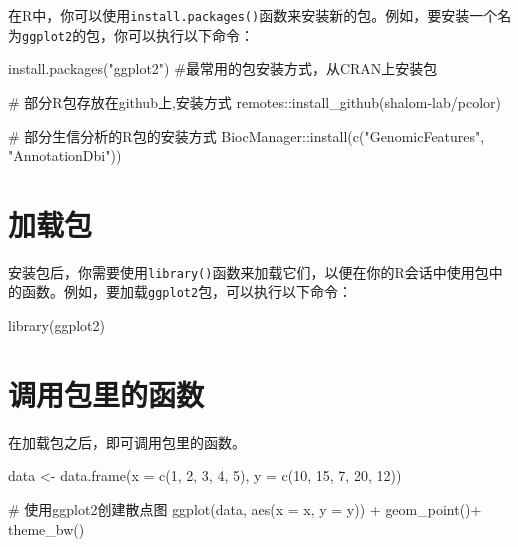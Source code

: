 \documentclass[
  letterpaper,
  DIV=11,
  numbers=noendperiod]{scrreprt}
\newenvironment{Shaded}{\begin{snugshade}}{\end{snugshade}}
\newcommand{\AttributeTok}[1]{\textcolor[rgb]{0.40,0.45,0.13}{#1}}
\newcommand{\CommentTok}[1]{\textcolor[rgb]{0.37,0.37,0.37}{#1}}
\newcommand{\DecValTok}[1]{\textcolor[rgb]{0.68,0.00,0.00}{#1}}
\newcommand{\FunctionTok}[1]{\textcolor[rgb]{0.28,0.35,0.67}{#1}}
\newcommand{\NormalTok}[1]{\textcolor[rgb]{0.00,0.23,0.31}{#1}}
\newcommand{\OtherTok}[1]{\textcolor[rgb]{0.00,0.23,0.31}{#1}}
\newcommand{\SpecialCharTok}[1]{\textcolor[rgb]{0.37,0.37,0.37}{#1}}
\newcommand{\StringTok}[1]{\textcolor[rgb]{0.13,0.47,0.30}{#1}}
\begin{document}
在R中，你可以使用\texttt{install.packages()}函数来安装新的包。例如，要安装一个名为\texttt{ggplot2}的包，你可以执行以下命令：

\begin{Shaded}
\begin{Highlighting}[]
\FunctionTok{install.packages}\NormalTok{(}\StringTok{"ggplot2"}\NormalTok{) }\CommentTok{\#最常用的包安装方式，从CRAN上安装包}

\CommentTok{\# 部分R包存放在github上,安装方式}
\NormalTok{remotes}\SpecialCharTok{::}\FunctionTok{install\_github}\NormalTok{(}\StringTok{\textquotesingle{}shalom{-}lab/pcolor\textquotesingle{}}\NormalTok{)}

\CommentTok{\# 部分生信分析的R包的安装方式}
\NormalTok{BiocManager}\SpecialCharTok{::}\FunctionTok{install}\NormalTok{(}\FunctionTok{c}\NormalTok{(}\StringTok{"GenomicFeatures"}\NormalTok{, }\StringTok{"AnnotationDbi"}\NormalTok{))}
\end{Highlighting}
\end{Shaded}

\section{加载包}\label{ux52a0ux8f7dux5305}

安装包后，你需要使用\texttt{library()}函数来加载它们，以便在你的R会话中使用包中的函数。例如，要加载\texttt{ggplot2}包，可以执行以下命令：

\begin{Shaded}
\begin{Highlighting}[]
\FunctionTok{library}\NormalTok{(ggplot2)}
\end{Highlighting}
\end{Shaded}

\section{调用包里的函数}\label{ux8c03ux7528ux5305ux91ccux7684ux51fdux6570}

在加载包之后，即可调用包里的函数。

\begin{Shaded}
\begin{Highlighting}[]
\NormalTok{data }\OtherTok{\textless{}{-}} \FunctionTok{data.frame}\NormalTok{(}\AttributeTok{x =} \FunctionTok{c}\NormalTok{(}\DecValTok{1}\NormalTok{, }\DecValTok{2}\NormalTok{, }\DecValTok{3}\NormalTok{, }\DecValTok{4}\NormalTok{, }\DecValTok{5}\NormalTok{), }\AttributeTok{y =} \FunctionTok{c}\NormalTok{(}\DecValTok{10}\NormalTok{, }\DecValTok{15}\NormalTok{, }\DecValTok{7}\NormalTok{, }\DecValTok{20}\NormalTok{, }\DecValTok{12}\NormalTok{))}

\CommentTok{\# 使用ggplot2创建散点图}
\FunctionTok{ggplot}\NormalTok{(data, }\FunctionTok{aes}\NormalTok{(}\AttributeTok{x =}\NormalTok{ x, }\AttributeTok{y =}\NormalTok{ y)) }\SpecialCharTok{+}
  \FunctionTok{geom\_point}\NormalTok{()}\SpecialCharTok{+}
  \FunctionTok{theme\_bw}\NormalTok{()}
\end{Highlighting}
\end{Shaded}
\end{document}
